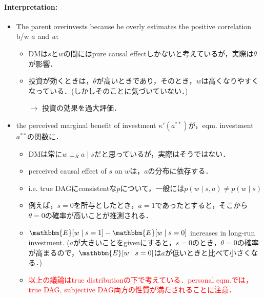\documentclass[11pt,a4paper,dvipdfmx]{article}
\theoremstyle{plain}
\newcommand{\E}{\mathbbm{E}}
\newcommand{\ocomment}[1]{{\textcolor{red}{#1}}}
\begin{document}
\paragraph{Interpretation:}
\begin{itemize}
	\item The parent overinvests because he overly estimates the positive correlation b/w $a$ and $w$:
	\begin{itemize}
		\item DMは$s$と$w$の間にはpure causal effectしかないと考えているが，実際は$\theta$が影響．
		\item 投資が効くときは，$\theta$が高いときであり，そのとき，$w$は高くなりやすくなっている．(しかしそのことに気づいていない．)
		\item[$\to$] 投資の効果を過大評価．
	\end{itemize}
	\item the perceived marginal benefit of investment $\kappa'(a^{**})$が，eqm. investment $a^{**}$の関数に．
	\begin{itemize}
		\item DMは常に$w \perp_R a \mid s$だと思っているが，実際はそうではない．
		\item perceived causal effect of $s$ on $w$は，$a$の分布に依存する．
		\item i.e. true DAGにconsistentな$p$について，一般には$p(w \mid s,a) \neq p(w \mid s)$
		\item 例えば，$s = 0$を所与としたとき，$a = 1$であったとすると，そこから$\theta = 0$の確率が高いことが推測される．
		\item $\E[w \mid s=1] - \E[w \mid s=0]$ increases in long-run investment. ($a$が大きいことをgivenにすると，$s=0$のとき，$\theta = 0$の確率が高まるので，$\E[w \mid s=0]$は$a$が低いときと比べて小さくなる．)
		\item \ocomment{以上の議論はtrue distributionの下で考えている．personal eqm.では，true DAG, subjective DAG両方の性質が満たされることに注意．}
	\end{itemize}
\end{itemize}
\end{document}
